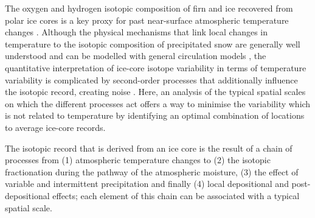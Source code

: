 \documentclass[cp, manuscript]{copernicus}
\begin{document}

\introduction

The oxygen and hydrogen isotopic composition of firn and ice recovered from
polar ice cores is a key proxy for past near-surface atmospheric temperature
changes \citep{Dansgaard1964,Lorius1969,Masson-Delmotte2008,Sjolte2011}.
Although the physical mechanisms that link local changes in temperature to the
isotopic composition of precipitated snow are generally well understood
\citep{Dansgaard1964,Craig1965,Jouzel1984} and can be modelled with general
circulation models
\citep{Joussaume1984,Werner2011,Werner2016,Sjolte2011,Goursaud2018}, the
quantitative interpretation of ice-core isotope variability in terms of
temperature variability is complicated by second-order processes that
additionally influence the isotopic record, creating noise \citep{Munch2018a}.
Here, an analysis of the typical spatial scales on which the different processes
act offers a way to minimise the variability which is not related to temperature
by identifying an optimal combination of locations to average ice-core records.

The isotopic record that is derived from an ice core is the result of a chain of
processes from (1) atmospheric temperature changes to (2) the isotopic
fractionation during the pathway of the atmospheric moisture, (3) the effect of
variable and intermittent precipitation and finally (4) local depositional and
post-depositional effects; each element of this chain can be associated with a
typical spatial scale.
\end{document}
